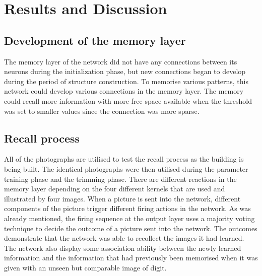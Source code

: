 \chapter{Results and Discussion}

\section{Development of the memory layer }
The memory layer of the network did not have any connections between its
neurons during the initialization phase, but new connections began to develop
during the period of structure construction. To memorise various patterns, this
network could develop various connections in the memory layer. The memory could
recall more information with more free space available when the threshold was
set to smaller values since the connection was more sparse.
\section{Recall process}
All of the photographs are utilised to test the recall process as the building
is being built. The identical photographs were then utilised during the
parameter training phase and the trimming phase. There are different reactions
in the memory layer depending on the four different kernels that are used and
illustrated by four images. When a picture is sent into the network, different
components of the picture trigger different firing actions in the network. As
was already mentioned, the firing sequence at the output layer uses a majority
voting technique to decide the outcome of a picture sent into the network. The
outcomes demonstrate that the network was able to recollect the images it had
learned. The network also display some association ability between the newly
learned information and the information that had previously been memorised when
it was given with an unseen but comparable image of digit.